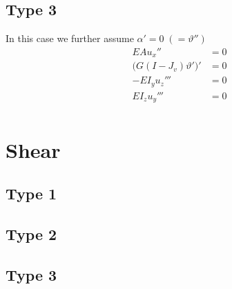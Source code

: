 \subsection{Type 3}
In this case we further assume \(\alpha' = 0 \; (=\vartheta'')\)
\begin{equation*}
\begin{aligned} 
EA u_{x}'' &= 0 \\ 
\bigl(G(I - J_v ) \vartheta' \bigr)'  &= 0 \\ 
-EI_y u_z''' &= 0 \\
 EI_z u_y''' &= 0 \\
\end{aligned} 
\end{equation*}

\section{Shear}


\subsection{Type 1}


\subsection{Type 2}


\subsection{Type 3}

